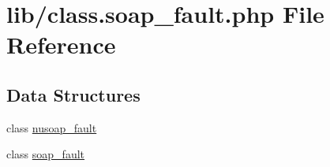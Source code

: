 \hypertarget{class_8soap__fault_8php}{}\section{lib/class.soap\+\_\+fault.\+php File Reference}
\label{class_8soap__fault_8php}
\subsection*{Data Structures}
\begin{DoxyCompactItemize}
\item 
class \hyperlink{classnusoap__fault}{nusoap\+\_\+fault}
\item 
class \hyperlink{classsoap__fault}{soap\+\_\+fault}
\end{DoxyCompactItemize}
